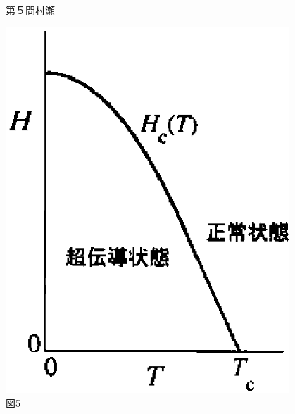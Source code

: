 \begin{question}{第５問}{村瀬}
\begin{center}
\begin{minipage}[t]{0.55\textwidth}
\begin{center}
    \end{center}
  \end{minipage}
  \begin{minipage}[t]{0.35\textwidth}
    \begin{center}
      \includegraphics[width=0.8\textwidth]{2006physQ5_5r.eps}\\図5
    \end{center}
  \end{minipage}
\end{center}
\end{question}

